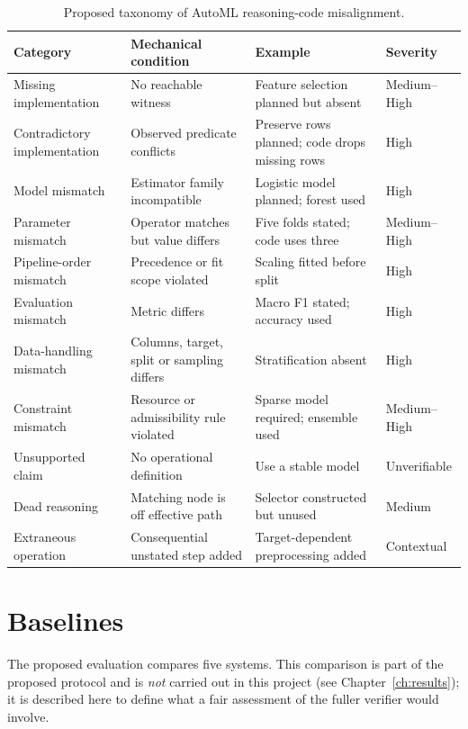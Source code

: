 \begin{table}[H]
\centering
\caption{Proposed taxonomy of AutoML reasoning-code misalignment.}
\label{tab:taxonomy}
\footnotesize
\setlength{\tabcolsep}{3pt}
\renewcommand{\arraystretch}{1.2}
\begin{tabular}{@{}
  >{\raggedright\arraybackslash}p{3.0cm}
  >{\raggedright\arraybackslash}p{3.8cm}
  >{\raggedright\arraybackslash}p{4.7cm}
  >{\raggedright\arraybackslash}p{2.3cm}@{}}
\toprule
\textbf{Category} & \textbf{Mechanical condition} &
\textbf{Example} & \textbf{Severity} \\
\midrule
Missing implementation & No reachable witness &
Feature selection planned but absent & Medium--High \\
Contradictory implementation & Observed predicate conflicts &
Preserve rows planned; code drops missing rows & High \\
Model mismatch & Estimator family incompatible &
Logistic model planned; forest used & High \\
Parameter mismatch & Operator matches but value differs &
Five folds stated; code uses three & Medium--High \\
Pipeline-order mismatch & Precedence or fit scope violated &
Scaling fitted before split & High \\
Evaluation mismatch & Metric differs &
Macro F1 stated; accuracy used & High \\
Data-handling mismatch & Columns, target, split or sampling differs
& Stratification absent & High \\
Constraint mismatch & Resource or admissibility rule violated &
Sparse model required; ensemble used & Medium--High \\
Unsupported claim & No operational definition &
Use a stable model & Unverifiable \\
Dead reasoning & Matching node is off effective path &
Selector constructed but unused & Medium \\
Extraneous operation & Consequential unstated step added &
Target-dependent preprocessing added & Contextual \\
\bottomrule
\end{tabular}
\end{table}

\section{Baselines}

The proposed evaluation compares five systems. This comparison is part
of the proposed protocol and is \emph{not} carried out in this project
(see Chapter~\ref{ch:results}); it is described here to define what a
fair assessment of the fuller verifier would involve.


